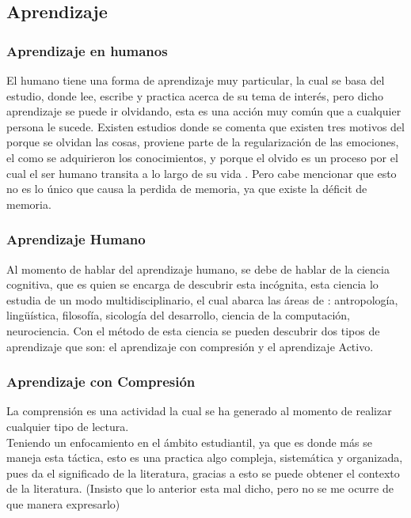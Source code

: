 \subsection{Aprendizaje}

\subsubsection{Aprendizaje en humanos}
        El humano tiene una forma de aprendizaje muy particular, la cual se basa del estudio, donde lee, escribe y practica acerca de
        su tema de interés, pero dicho aprendizaje se puede ir olvidando, esta es una acción muy común que a cualquier persona le sucede.
        Existen estudios donde se comenta que existen tres motivos del porque se olvidan las cosas, proviene parte de la regularización de las emociones,
        el como se adquirieron los conocimientos, y porque el olvido es un proceso por el cual el ser humano transita a lo largo de su vida \cite{Nrby2015}. Pero cabe
        mencionar que esto no es lo único que causa la perdida de memoria, ya que existe la déficit de memoria. 

    \subsubsection{Aprendizaje Humano}
        Al momento de hablar del aprendizaje humano, se debe de hablar de la ciencia cognitiva, que es quien se encarga de descubrir esta incógnita,
        esta ciencia lo estudia de un modo multidisciplinario, el cual abarca las \'areas de \cite{bransford2000}: antropología, lingüística, 
        filosofía, sicología del desarrollo, ciencia de la computación, neurociencia.
        Con el método de esta ciencia se pueden descubrir dos tipos de aprendizaje que son: el aprendizaje con compresi\'on y el aprendizaje Activo.
        
        \subsubsection{Aprendizaje con Compresi\'on}
            La comprensi\'on es una actividad la cual se ha generado al momento de realizar cualquier tipo de lectura.\\
            Teniendo un enfocamiento en el \'ambito estudiantil, ya que es donde m\'as se maneja esta t\'actica, esto es una
            practica algo compleja, sistemática y organizada, pues da el significado de la literatura, gracias a esto se puede
            obtener el contexto de la literatura.
            (Insisto que lo anterior esta mal dicho, pero no se me ocurre de que manera expresarlo)


